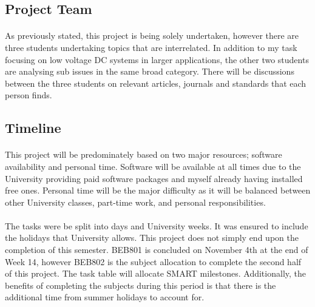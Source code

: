 
\subsection{Project Team}

\paragraph{}
As previously stated, this project is being solely undertaken, however there are three students undertaking topics that are interrelated. In addition to my task focusing on low voltage DC systems in larger applications, the other two students are analysing sub issues in the same broad category. There will be discussions between the three students on relevant articles, journals and standards that each person finds.

\newpage
\subsection{Timeline}

\paragraph{}
This project will be predominately based on two major resources; software availability and personal time. Software will be available at all times due to the University providing paid software packages and myself already having installed free ones. Personal time will be the major difficulty as it will be balanced between other University classes, part-time work, and personal responsibilities.   

\paragraph{}
The tasks were be split into days and University weeks. It was ensured to include the holidays that University allows. This project does not simply end upon the completion of this semester. BEB801 is concluded on November 4th at the end of Week 14, however BEB802 is the subject allocation to complete the second half of this project. The task table will allocate SMART milestones. Additionally, the benefits of completing the subjects during this period is that there is the additional time from summer holidays to account for.

